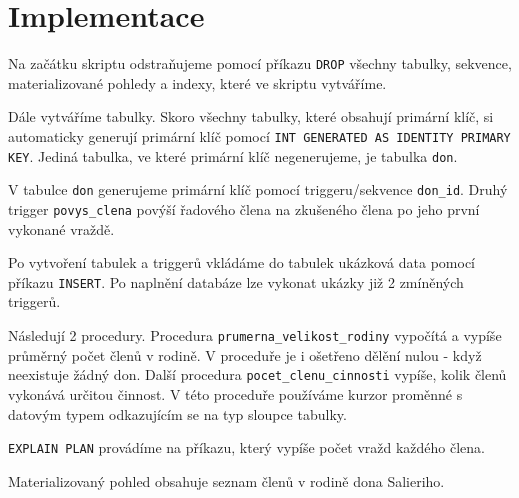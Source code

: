 \documentclass{article}
\begin{document}
\section*{Implementace}
Na začátku skriptu odstraňujeme pomocí příkazu \texttt{DROP} všechny tabulky, sekvence, materializované pohledy a indexy, které ve skriptu vytváříme.

Dále vytváříme tabulky. Skoro všechny tabulky, které obsahují primární klíč, si automaticky generují primární klíč pomocí \texttt{INT GENERATED AS IDENTITY PRIMARY KEY}. Jediná tabulka, ve které primární klíč negenerujeme, je tabulka \texttt{don}.

V tabulce \texttt{don} generujeme primární klíč pomocí triggeru/sekvence \texttt{don\_id}.
Druhý trigger \texttt{povys\_clena} povýší řadového člena na zkušeného člena po jeho první vykonané vraždě.

Po vytvoření tabulek a triggerů vkládáme do tabulek ukázková data pomocí příkazu \texttt{INSERT}.
Po naplnění databáze lze vykonat ukázky již 2 zmíněných triggerů.

Následují 2 procedury. Procedura \texttt{prumerna\_velikost\_rodiny} vypočítá a vypíše průměrný počet členů v rodině. V proceduře je i ošetřeno dělění nulou - když neexistuje žádný don.
Další procedura \texttt{pocet\_clenu\_cinnosti} vypíše, kolik členů vykonává určitou činnost. V této proceduře používáme kurzor proměnné s datovým typem odkazujícím se na typ sloupce tabulky.

\texttt{EXPLAIN PLAN} provádíme na příkazu, který vypíše počet vražd každého člena.

Materializovaný pohled obsahuje seznam členů v rodině dona Salieriho. 
\end{document}
